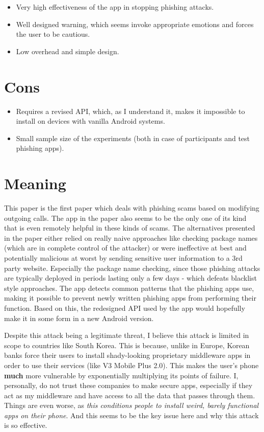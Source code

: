 \documentclass{article}
\begin{document}
\begin{itemize}
	\item Very high effectiveness of the app in stopping phishing attacks.
	\item Well designed warning, which seems invoke appropriate emotions and forces the user to be cautious.
	\item Low overhead and simple design.
\end{itemize}

\section{Cons}

\begin{itemize}
	\item Requires a revised API, which, as I understand it, makes it impossible to install on devices with vanilla Android systems.
	\item Small sample size of the experiments (both in case of participants and test phishing apps).
\end{itemize}

\section{Meaning}

This paper is the first paper which deals with phishing scams based on modifying outgoing calls. The app in the paper also seems to be the only one of its kind that is even remotely helpful in these kinds of scams. The alternatives presented in the paper either relied on really naive approaches like checking package names (which are in complete control of the attacker) or were ineffective at best and potentially malicious at worst by sending sensitive user information to a 3rd party website. Especially the package name checking, since those phishing attacks are typically deployed in periods lasting only a few days - which defeats blacklist style approaches. The app detects common patterns that the phishing apps use, making it possible to prevent newly written phishing apps from performing their function. Based on this, the redesigned API used by the app would hopefully make it in some form in a new Android version.

Despite this attack being a legitimate threat, I believe this attack is limited in scope to countries like South Korea. This is because, unlike in Europe, Korean banks force their users to install shady-looking proprietary middleware apps in order to use their services (like V3 Mobile Plus 2.0). This makes the user's phone \textbf{much} more vulnerable by exponentially multiplying its points of failure. I, personally, do not trust these companies to make secure apps, especially if they act as my middleware and have access to all the data that passes through them. Things are even worse, as \textit{this conditions people to install weird, barely functional apps on their phone}. And this seems to be the key issue here and why this attack is so effective.
\end{document}
